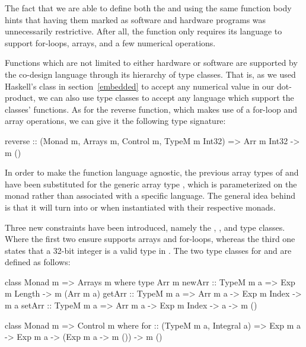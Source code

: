 \documentclass[../paper.tex]{subfiles}
\begin{document}

The fact that we are able to define both the  and  using the same function body hints that having them marked as software and hardware programs was unnecessarily restrictive. After all, the function only requires its language to support for-loops, arrays, and a few numerical operations.

Functions which are not limited to either hardware or software are supported by the co-design language through its hierarchy of type classes. That is, as we used Haskell's  class in section~\ref{embedded} to accept any numerical value in our dot-product, we can also use type classes to accept any language which support the classes' functions. As for the reverse function, which makes use of a for-loop and array operations, we can give it the following type signature:

\begin{code}
reverse :: (Monad m, Arrays m, Control m, TypeM m Int32)
        => Arr m Int32 -> m ()
\end{code}

\noindent In order to make the function language agnostic, the previous array types of  and  have been substituted for the generic array type , which is parameterized on the monad  rather than associated with a specific language. The general idea behind  is that it will turn into  or  when instantiated with their respective monads.

Three new constraints have been introduced, namely the , , and  type classes. Where the first two ensure  supports arrays and for-loops, whereas the third one states that a 32-bit integer is a valid type in . The two type classes for  and  are defined as follows:

\begin{code}
class Monad m => Arrays m where
  type Arr m
  newArr :: TypeM m a => Exp m Length -> m (Arr m a)
  getArr :: TypeM m a => Arr m a -> Exp m Index -> m a
  setArr :: TypeM m a => Arr m a -> Exp m Index -> a -> m ()

class Monad m => Control m where
  for :: (TypeM m a, Integral a) => Exp m a -> Exp m a -> (Exp m a -> m ())
      -> m ()
\end{code}
\end{document}

